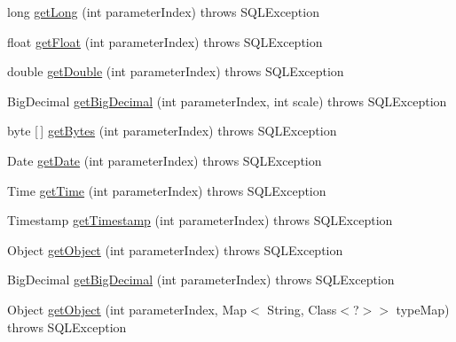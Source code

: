 \begin{DoxyCompactItemize}
\item 
long \mbox{\hyperlink{classcom_1_1mysql_1_1cj_1_1jdbc_1_1_callable_statement_wrapper_a62fcfa4febd178fab887009064cd6ba8}{get\+Long}} (int parameter\+Index)  throws S\+Q\+L\+Exception 
\item 
float \mbox{\hyperlink{classcom_1_1mysql_1_1cj_1_1jdbc_1_1_callable_statement_wrapper_a7a5920621690a03b6a879c970baca451}{get\+Float}} (int parameter\+Index)  throws S\+Q\+L\+Exception 
\item 
double \mbox{\hyperlink{classcom_1_1mysql_1_1cj_1_1jdbc_1_1_callable_statement_wrapper_a71b16cdb9e9f4bc2a1264b00cd8157de}{get\+Double}} (int parameter\+Index)  throws S\+Q\+L\+Exception 
\item 
Big\+Decimal \mbox{\hyperlink{classcom_1_1mysql_1_1cj_1_1jdbc_1_1_callable_statement_wrapper_aabb06a7543c93357c408fcbf1451d241}{get\+Big\+Decimal}} (int parameter\+Index, int scale)  throws S\+Q\+L\+Exception 
\item 
byte \mbox{[}$\,$\mbox{]} \mbox{\hyperlink{classcom_1_1mysql_1_1cj_1_1jdbc_1_1_callable_statement_wrapper_a33a04c98fb179f10044fd3ecf6acd81b}{get\+Bytes}} (int parameter\+Index)  throws S\+Q\+L\+Exception 
\item 
Date \mbox{\hyperlink{classcom_1_1mysql_1_1cj_1_1jdbc_1_1_callable_statement_wrapper_ad72f6af2c2145a0b711e39c35d8de37a}{get\+Date}} (int parameter\+Index)  throws S\+Q\+L\+Exception 
\item 
Time \mbox{\hyperlink{classcom_1_1mysql_1_1cj_1_1jdbc_1_1_callable_statement_wrapper_ac6ae348f75727284f4ee244e731109fb}{get\+Time}} (int parameter\+Index)  throws S\+Q\+L\+Exception 
\item 
Timestamp \mbox{\hyperlink{classcom_1_1mysql_1_1cj_1_1jdbc_1_1_callable_statement_wrapper_a4c42eb1a7e9d3d711ebbfab24783ba54}{get\+Timestamp}} (int parameter\+Index)  throws S\+Q\+L\+Exception 
\item 
Object \mbox{\hyperlink{classcom_1_1mysql_1_1cj_1_1jdbc_1_1_callable_statement_wrapper_a1559252d0b3ea2b04ca1b6cbba5cd022}{get\+Object}} (int parameter\+Index)  throws S\+Q\+L\+Exception 
\item 
Big\+Decimal \mbox{\hyperlink{classcom_1_1mysql_1_1cj_1_1jdbc_1_1_callable_statement_wrapper_a008af4c155c1e7a47eafaf9c10f6488c}{get\+Big\+Decimal}} (int parameter\+Index)  throws S\+Q\+L\+Exception 
\item 
Object \mbox{\hyperlink{classcom_1_1mysql_1_1cj_1_1jdbc_1_1_callable_statement_wrapper_a878edbe5b4d6d8a93cbe01e2072f0cd3}{get\+Object}} (int parameter\+Index, Map$<$ String, Class$<$?$>$$>$ type\+Map)  throws S\+Q\+L\+Exception 
$$
\end{DoxyCompactItemize}
